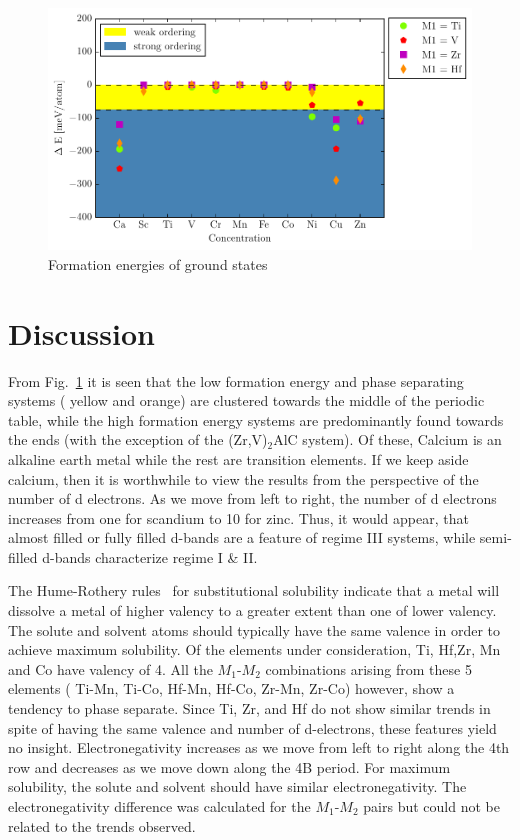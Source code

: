 \documentclass[preprint,amsmath,amssymb,aps, prb,showkeys]{revtex4-1}
\newcommand{\fig}[1]{Fig.~\ref{#1}}
\begin{document}
\begin{figure}[!htb]
\centering
\includegraphics[scale=0.95]{figure_14.pdf}
\caption{Formation energies of ground states}
\label{fig:MAX_overall_results_energies}
\end{figure}
\section{Discussion}
\label{sec:discussion}

From \fig{fig:MAX_overall_results_energies} it is seen that the low formation energy and phase separating systems ( yellow and orange) are clustered towards the middle of the periodic table, while the high formation energy systems are predominantly found towards the ends (with the exception of the (Zr,V)$_2$AlC system). Of these, Calcium is an alkaline earth metal while the rest are transition elements. If we keep aside calcium, then it is worthwhile to view the results from the perspective of the number of d electrons. As we move from left to right, the number of d electrons increases from one for scandium to 10 for zinc. Thus, it would appear, that almost filled or fully filled d-bands are a feature of  regime III systems, while semi-filled d-bands characterize regime I \& II.

The Hume-Rothery rules~\cite{hume1934freezing} for  substitutional solubility indicate that a metal will dissolve a metal of higher valency to a greater extent than one of lower valency. The solute and solvent atoms should typically have the same valence in order to achieve maximum solubility. Of the elements under consideration, Ti, Hf,Zr, Mn and Co have valency of 4. All the $M_1$-$M_2$ combinations arising from these 5 elements ( Ti-Mn, Ti-Co, Hf-Mn, Hf-Co, Zr-Mn, Zr-Co) however, show a tendency to phase separate. Since Ti, Zr, and Hf do not show similar trends in spite of having the same valence and number of d-electrons, these features yield no insight. Electronegativity increases as we move from left to right along the 4th row and decreases as we move down along the 4B period. For maximum solubility, the solute and solvent should have similar electronegativity. The electronegativity difference was calculated for the $M_1$-$M_2$ pairs but could not be related to the trends observed. 
\end{document}
